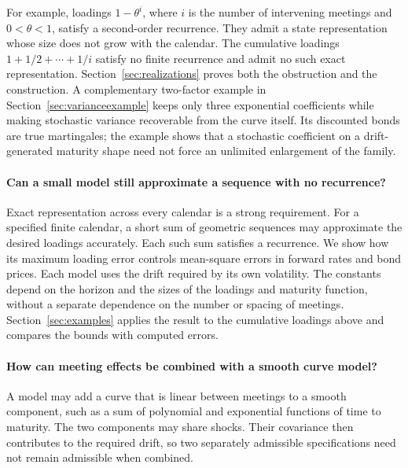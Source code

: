 For example, loadings $1-\theta^i$, where $i$ is the number of intervening meetings and $0<\theta<1$, satisfy a second-order recurrence. They admit a state representation whose size does not grow with the calendar. The cumulative loadings $1+1/2+\cdots+1/i$ satisfy no finite recurrence and admit no such exact representation. Section~\ref{sec:realizations} proves both the obstruction and the construction. A complementary two-factor example in Section~\ref{sec:varianceexample} keeps only three exponential coefficients while making stochastic variance recoverable from the curve itself. Its discounted bonds are true martingales; the example shows that a stochastic coefficient on a drift-generated maturity shape need not force an unlimited enlargement of the family.

\paragraph{Can a small model still approximate a sequence with no recurrence?}
Exact representation across every calendar is a strong requirement. For a specified finite calendar, a short sum of geometric sequences may approximate the desired loadings accurately. Each such sum satisfies a recurrence. We show how its maximum loading error controls mean-square errors in forward rates and bond prices. Each model uses the drift required by its own volatility. The constants depend on the horizon and the sizes of the loadings and maturity function, without a separate dependence on the number or spacing of meetings. Section~\ref{sec:examples} applies the result to the cumulative loadings above and compares the bounds with computed errors.

\paragraph{How can meeting effects be combined with a smooth curve model?}
A model may add a curve that is linear between meetings to a smooth component, such as a sum of polynomial and exponential functions of time to maturity. The two components may share shocks. Their covariance then contributes to the required drift, so two separately admissible specifications need not remain admissible when combined.

